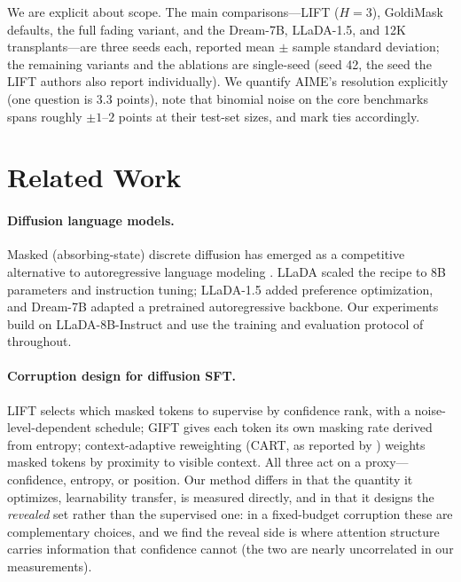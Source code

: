 \documentclass{article} %
\begin{document}
We are explicit about scope. The main comparisons---LIFT ($H{=}3$), GoldiMask defaults, the full fading variant, and the Dream-7B, LLaDA-1.5, and 12K transplants---are three seeds each, reported mean $\pm$ sample standard deviation; the remaining variants and the ablations are single-seed (seed 42, the seed the LIFT authors also report individually). We quantify AIME's resolution explicitly (one question is 3.3 points), note that binomial noise on the core benchmarks spans roughly $\pm 1$--$2$ points at their test-set sizes, and mark ties accordingly.

\section{Related Work}

\paragraph{Diffusion language models.} Masked (absorbing-state) discrete diffusion has emerged as a competitive alternative to autoregressive language modeling \citep{austin2021structured,lou2024discrete,sahoo2024simple}. LLaDA \citep{nie2024llada} scaled the recipe to 8B parameters and instruction tuning; LLaDA-1.5 \citep{zhu2025llada15} added preference optimization, and Dream-7B \citep{ye2025dream} adapted a pretrained autoregressive backbone. Our experiments build on LLaDA-8B-Instruct and use the training and evaluation protocol of \citet{lift2026} throughout.

\paragraph{Corruption design for diffusion SFT.} LIFT \citep{lift2026} selects which masked tokens to supervise by confidence rank, with a noise-level-dependent schedule; GIFT \citep{gift2025} gives each token its own masking rate derived from entropy; context-adaptive reweighting (CART, as reported by \citet{lift2026}) weights masked tokens by proximity to visible context. All three act on a proxy---confidence, entropy, or position. Our method differs in that the quantity it optimizes, learnability transfer, is measured directly, and in that it designs the \emph{revealed} set rather than the supervised one: in a fixed-budget corruption these are complementary choices, and we find the reveal side is where attention structure carries information that confidence cannot (the two are nearly uncorrelated in our measurements).
\end{document}
